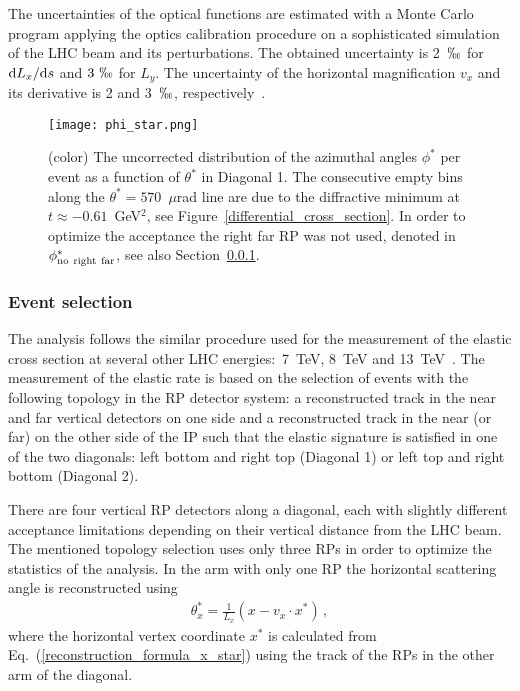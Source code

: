 \documentclass[TOTEM]{cernphprep}
\begin{document}
	The uncertainties of the optical functions are estimated with a Monte Carlo program applying the optics calibration procedure
	on a sophisticated simulation of the LHC beam and its perturbations. The obtained uncertainty is  2~$\permil$ for ${{\rm d}L_{x}}/{{\rm d}s}$ and $3~\permil$ for $L_{y}$.
	The uncertainty of the horizontal magnification $v_{x}$ and its derivative is 2 and 3~$\permil$, respectively~\cite{Antchev:2014voa,Nemes:2131667}.

	\begin{figure}[H]
		\centering
		\texttt{[image: phi\_star.png]}
		\caption{(color) The uncorrected distribution of the azimuthal angles $\phi^{*}$ per event as a function of $\theta^{*}$ in Diagonal 1. The consecutive empty bins along the $\theta^{*}=570$~$\mu$rad
		line are due to the diffractive minimum at $t\approx-0.61$~GeV$^{2}$, see Figure~\ref{differential_cross_section}. In order to optimize the
		acceptance the right far RP was not used, denoted in $\phi^{*}_{\rm no~right~far}$, see also Section~\ref{event_selection}.}
		\label{cuts2}
 	\end{figure}

	\subsubsection{Event selection}
	\label{event_selection}

	The analysis follows the similar procedure used for the measurement of the elastic cross section at several other LHC energies:~7~TeV, 8~TeV and 13~TeV~\cite{Antchev:2013paa,Antchev:2016vpy,Antchev:2011vs,Antchev:2013iaa,Nemes:2017gut,Antchev:2017dia,Paper_2p76}. 
	The measurement of the elastic rate is based on the selection of events with the following topology in the RP detector system: a reconstructed track in the near and far
	vertical detectors on one side and a reconstructed track in the near (or far) on the other side of the IP such that the elastic signature is satisfied in one of the two diagonals: left bottom and right top (Diagonal 1) or left top and right bottom (Diagonal 2).
	
	There are four vertical RP detectors along a diagonal, each with slightly different acceptance limitations depending on their vertical distance from the LHC beam. The mentioned topology selection uses only three RPs in order to optimize the statistics of the analysis.
	In the arm with only one RP the horizontal scattering angle is reconstructed using
			\begin{align}
			    \theta_{x}^{*} = \frac{1}{L_{x}}\left(x- v_{x}\cdot x^{*}\right)\,,
			    \label{reconstruction_formula_theta_x_rearranged_from_x}
			\end{align}
	where the horizontal vertex coordinate $x^{*}$ is calculated from Eq.~(\ref{reconstruction_formula_x_star}) using the track of the RPs in the other arm of the diagonal.
	
\end{document}
